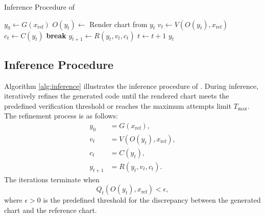 \begin{algorithm} [tb]
\caption{Inference Procedure of \model{}}
\label{alg:inference}
\begin{algorithmic}[1]
\State \(y_0 \gets G(x_{\text{ref}})\)
    \State \(O(y_t) \gets\) Render chart from \(y_t\)
    \State \(v_t \gets V(O(y_t), x_{\text{ref}})\) 
    \State \(c_t \gets C(y_t)\) 
        \State \textbf{break} 
    \Else
        \State \(y_{t+1} \gets R(y_t, v_t, c_t)\) 
    \EndIf
    \State \(t \gets t+1\)
\EndWhile
\State \Return \(y_t\)
\end{algorithmic}
\end{algorithm}

\subsection{Inference Procedure}
\label{sec:test-time-scaling}
Algorithm \ref{alg:inference} illustrates the inference procedure of \model{}. During inference, \model{} iteratively refines the generated code until the rendered chart meets the predefined verification threshold or reaches the maximum attempts limit $T_{\max}$. The refinement process is as follows:
\begin{align}
    y_0 &= G(x_{\text{ref}}), \\
    v_t &= V(O(y_t), x_{\text{ref}}), \\
    c_t &= C(y_t), \\
    y_{t+1} &= R(y_t, v_t, c_t).
\end{align}
The iterations terminate when
\[
    Q_t(O(y_t), x_{\text{ref}}) < \epsilon,
\]
where \(\epsilon > 0\) is the predefined threshold for the discrepancy between the generated chart and the reference chart. 










